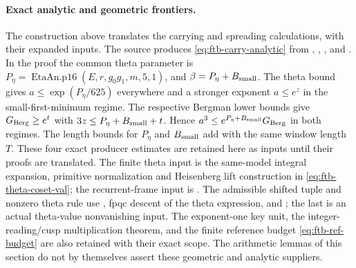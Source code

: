 \paragraph{Exact analytic and geometric frontiers.}
The construction above translates the carrying and spreading
calculations, with their expanded inputs.  The source produces
\eqref{eq:ftb-carry-analytic} from
,
,
, and
.  In the proof the common theta parameter
is \(P_\eta=\operatorname{EtaAn.p16}(E,r,g_0g_1,m,5,1)\),
and \(\beta=P_\eta+B_{\rm small}\).
The theta bound gives \(a\leq\exp(P_\eta/625)\) everywhere and a
stronger exponent \(a\leq e^z\) in the small-first-minimum regime.
The respective Bergman lower bounds give \(G_{\rm Berg}\geq e^t\)
with \(3z\leq P_\eta+B_{\rm small}+t\).
Hence
\(a^3\leq e^{P_\eta+B_{\rm small}}G_{\rm Berg}\) in both regimes.
The length bounds for \(P_\eta\) and \(B_{\rm small}\) add with the
same window length \(T\).  These four exact producer estimates
are retained here as inputs until their proofs are translated.
The finite theta input is the same-model integral expansion,
primitive normalization and Heisenberg lift construction in
\eqref{eq:ftb-theta-coset-val}; the recurrent-frame input is
.  The admissible shifted tuple and nonzero theta rule use
, fpqc descent of the theta expression, and
; the last is an actual theta-value
nonvanishing input.  The exponent-one key unit, the
integer-reading/cusp multiplication theorem, and the finite reference
budget \eqref{eq:ftb-ref-budget} are also retained with their exact
scope.  The arithmetic lemmas of this section do not by themselves
assert these geometric and analytic suppliers.
